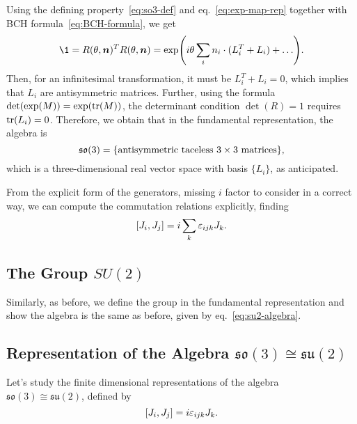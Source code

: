 Using the defining property~\eqref{eq:so3-def} and eq.~\eqref{eq:exp-map-rep} together with BCH formula~\eqref{eq:BCH-formula}, we get
\begin{equation*}
    \1 = R(\theta, \vec{n})^T R(\theta, \vec{n}) = \exp({i \theta \sum_i n_i \cdot ({L}_i^T + L_i) + \dots}) .
\end{equation*}
Then, for an infinitesimal transformation, it must be $L^T_i + L_i = 0$, which implies that $L_i$ are antisymmetric matrices. Further, using the formula $\det(\exp(M)) = \exp(\textup{tr}(M))$, the determinant condition $\det(R) = 1$ requires $\tr(L_i) = 0$. Therefore, we obtain that in the fundamental representation, the algebra is
\begin{equation}
    \mathfrak{so}(3) = \{ \textup{antisymmetric taceless $3 \times 3$ matrices}\},
\end{equation}
which is a three-dimensional real vector space with basis $\{L_i\}$, as anticipated.

From the explicit form of the generators, \color{red} missing $i$ factor to consider in a correct way, \color{black} we can compute the commutation relations explicitly, finding
\begin{equation}\label{eq:su2-algebra}
    \comm{J_i}{J_j} = i \sum_k \epsilon_{ijk} J_k .
\end{equation}

\subsection{The Group \texorpdfstring{$SU(2)$}{SU(2)}}
\color{red} Similarly, as before, we define the group in the fundamental representation and show the algebra is the same as before, given by eq.~\eqref{eq:su2-algebra}. \color{black}

\subsection{Representation of the Algebra \texorpdfstring{$\mathfrak{so}(3) \cong \mathfrak{su}(2)$}{isomorphic}}
Let's study the finite dimensional representations of the algebra $\mathfrak{so}(3) \cong \mathfrak{su}(2)$, defined by
\begin{equation}\label{eq:su2-commutation-relations}
    \comm{J_i}{J_j} = i \epsilon_{ijk} J_k .
\end{equation}

